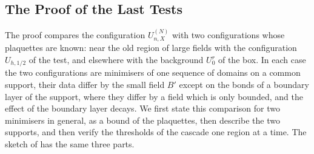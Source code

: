 \documentclass[11pt]{preprint}
\numberwithin{equation}{section}
\begin{document}
\subsection{The Proof of the Last Tests}\label{sec:last-tests-proof}

The proof compares the configuration $U^{(N)}_{n,X}$ with two configurations whose plaquettes are known: near the old region of large fields with the configuration $U_{h,1/2}$ of the test, and elsewhere with the background $U^r_0$ of the box. In each case the two configurations are minimisers of one sequence of domains on a common support, their data differ by the small field $B'$ except on the bonds of a boundary layer of the support, where they differ by a field which is only bounded, and the effect of the boundary layer decays. We first state this comparison for two minimisers in general, as a bound of the plaquettes, then describe the two supports, and then verify the thresholds of the cascade one region at a time. The sketch of \cite[pp.~198--200]{BalabanLFR1} has the same three parts.
\end{document}
